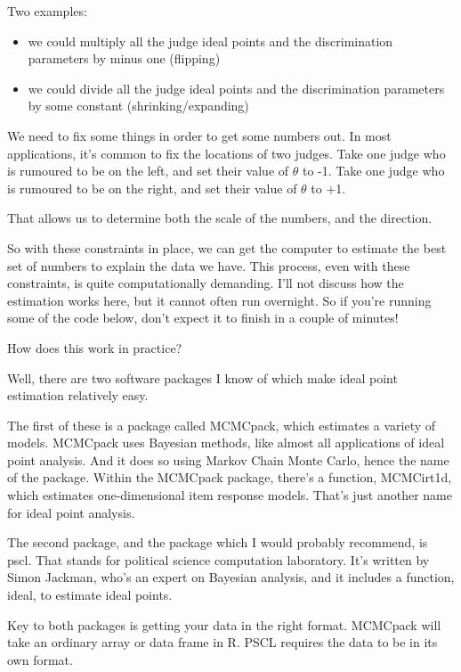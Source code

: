 \documentclass[12pt,twoside]{article}
\providecommand{\tightlist}{%
  \setlength{\itemsep}{0pt}\setlength{\parskip}{0pt}}
\begin{document}
Two examples:

\begin{itemize}
\tightlist
\item
  we could multiply all the judge ideal points and the discrimination
  parameters by minus one (flipping)
\item
  we could divide all the judge ideal points and the discrimination
  parameters by some constant (shrinking/expanding)
\end{itemize}

We need to fix some things in order to get some numbers out. In most
applications, it's common to fix the locations of two judges. Take one
judge who is rumoured to be on the left, and set their value of
\(\theta\) to -1. Take one judge who is rumoured to be on the right, and
set their value of \(\theta\) to +1.

That allows us to determine both the scale of the numbers, and the
direction.

So with these constraints in place, we can get the computer to estimate
the best set of numbers to explain the data we have. This process, even
with these constraints, is quite computationally demanding. I'll not
discuss how the estimation works here, but it cannot often run
overnight. So if you're running some of the code below, don't expect it
to finish in a couple of minutes!

How does this work in practice?

Well, there are two software packages I know of which make ideal point
estimation relatively easy.

The first of these is a package called MCMCpack, which estimates a
variety of models. MCMCpack uses Bayesian methods, like almost all
applications of ideal point analysis. And it does so using Markov Chain
Monte Carlo, hence the name of the package. Within the MCMCpack package,
there's a function, MCMCirt1d, which estimates one-dimensional item
response models. That's just another name for ideal point analysis.

The second package, and the package which I would probably recommend, is
pscl. That stands for political science computation laboratory. It's
written by Simon Jackman, who's an expert on Bayesian analysis, and it
includes a function, ideal, to estimate ideal points.

Key to both packages is getting your data in the right format. MCMCpack
will take an ordinary array or data frame in R. PSCL requires the data
to be in its own format.
\end{document}
